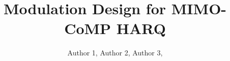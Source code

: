\documentclass[journal]{IEEEtran}
\begin{document}
%
\title{Modulation Design for MIMO-CoMP HARQ}
%
%
%

\author{
  Author 1,
  Author 2,
  Author 3,
}

% 
%



% 
\end{document}
